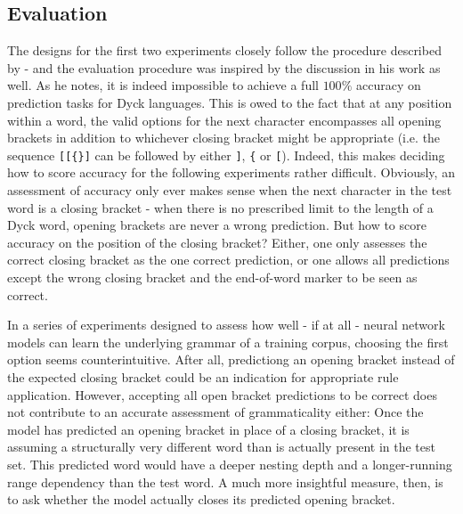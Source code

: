 \subsection{Evaluation}\label{evaluation}
The designs for the first two experiments closely follow the procedure described by \cite{Bernardy2018} - and the evaluation procedure was inspired by the discussion in his work as well. As he notes, it is indeed impossible to achieve a full $100\%$ accuracy on prediction tasks for Dyck languages. This is owed to the fact that at any position within a word, the valid options for the next character encompasses all opening brackets in addition to whichever closing bracket might be appropriate (i.e. the sequence \texttt{[[\{\}]} can be followed by either \texttt{]}, \texttt{\{} or \texttt{[}). Indeed, this makes deciding how to score accuracy for the following experiments rather difficult. Obviously, an assessment of accuracy only ever makes sense when the next character in the test word is a closing bracket - when there is no prescribed limit to the length of a Dyck word, opening brackets are never a wrong prediction. But how to score accuracy on the position of the closing bracket? Either, one only assesses the correct closing bracket as the one correct prediction, or one allows all predictions except the wrong closing bracket and the end-of-word marker to be seen as correct.

In a series of experiments designed to assess how well - if at all - neural network models can learn the underlying grammar of a training corpus, choosing the first option seems counterintuitive. After all, predictiong an opening bracket instead of the expected closing bracket could be an indication for appropriate rule application. However, accepting all open bracket predictions to be correct does not contribute to an accurate assessment of grammaticality either: Once the model has predicted an opening bracket in place of a closing bracket, it is assuming a structurally very different word than is actually present in the test set. This predicted word would have a deeper nesting depth and a longer-running range dependency than the test word. A much more insightful measure, then, is to ask whether the model actually closes its predicted opening bracket.


